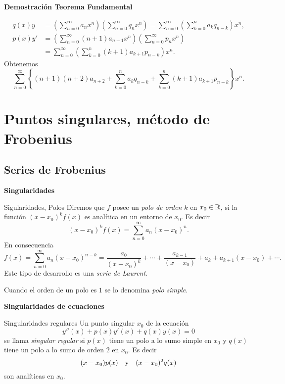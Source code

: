 \begin{frame}[fragile]{\textbf{Demostración Teorema Fundamental}}

\[
   \begin{split}
     q(x)y&=\left(\sum_{n=0}^{\infty}a_nx^n\right)\left(\sum_{n=0}^{\infty}q_nx^n\right)=\sum_{n=0}^{\infty}\left(\sum_{k=0}^na_kq_{n-k}\right)x^n,\\
     p(x)y'&=\left(\sum_{n=0}^{\infty}(n+1)a_{n+1}x^n\right)\left(\sum_{n=0}^{\infty}p_nx^n\right)\\
     &=\sum_{n=0}^{\infty}\left(\sum_{k=0}^n(k+1)a_{k+1}p_{n-k}\right)x^n.
   \end{split}
\]
Obtenemos
\[\sum_{n=0}^{\infty}\left\{ (n+1)(n+2)a_{n+2}+ \sum_{k=0}^na_kq_{n-k}+ \sum_{k=0}^n(k+1)a_{k+1}p_{n-k} \right\}x^n.\]



\end{frame}




\section{Puntos singulares, método de Frobenius}


\subsection{Series de Frobenius}


\begin{frame}{\textbf{Singularidades}}


\begin{block}{Sigularidades, Polos}  Diremos que $f$ posee un \emph{polo de orden $k$} en $x_0\in\mathbb{R}$, si la función $(x-x_0)^kf(x)$ es analítica en un entorno de $x_0$. Es decir
\[(x-x_0)^kf(x)=\sum_{n=0}^{\infty}a_n(x-x_0)^n.\]
En consecuencia
{\small
\[f(x)=\sum_{n=0}^{\infty}a_n(x-x_0)^{n-k}=\frac{a_0}{(x-x_0)^k}+\cdots+\frac{a_{k-1}}{(x-x_0)}+a_k+a_{k+1}(x-x_0)+\cdots.\]
}
Este tipo de desarrollo es una  \emph{serie de Laurent}.

Cuando el orden de un polo es $1$ se lo denomina \emph{polo simple}.
\end{block}

\end{frame}


\begin{frame}{\textbf{Singularidades de ecuaciones}}
\begin{block}{Singularidades regulares} Un punto singular $x_0$ de la ecuación
\[y''(x)+p(x)y'(x)+q(x)y(x)=0\]
se llama \emph{singular regular} si $p(x)$ tiene un polo a lo sumo simple en $x_0$ y $q(x)$ tiene un polo a lo sumo de orden $2$ en $x_0$. Es decir
\[(x-x_0)p(x)\quad\hbox{y}\quad (x-x_0)^2q(x)\]
son analíticas en $x_0$.
\end{block}

\end{frame}


